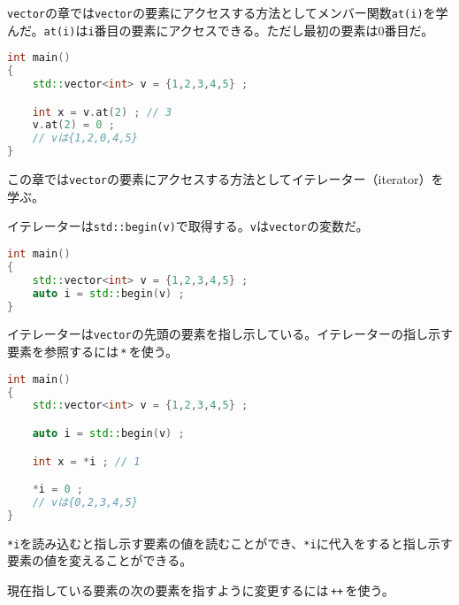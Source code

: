 
\texttt{vector}の章では\texttt{vector}の要素にアクセスする方法としてメンバー関数\texttt{at(i)}を学んだ。\texttt{at(i)}は\texttt{i}番目の要素にアクセスできる。ただし最初の要素は0番目だ。

\begin{lstlisting}[language={C++}]
int main()
{
    std::vector<int> v = {1,2,3,4,5} ;

    int x = v.at(2) ; // 3
    v.at(2) = 0 ;
    // vは{1,2,0,4,5}
}
\end{lstlisting}

この章では\texttt{vector}の要素にアクセスする方法としてイテレーター（iterator）を学ぶ。


イテレーターは\texttt{std::begin(v)}で取得する。\texttt{v}は\texttt{vector}の変数だ。

\begin{lstlisting}[language={C++}]
int main()
{
    std::vector<int> v = {1,2,3,4,5} ;
    auto i = std::begin(v) ;
}
\end{lstlisting}


イテレーターは\texttt{vector}の先頭の要素を指し示している。イテレーターの指し示す要素を参照するには\,\texttt{*}\,を使う。

\begin{lstlisting}[language={C++}]
int main()
{
    std::vector<int> v = {1,2,3,4,5} ;

    auto i = std::begin(v) ;

    int x = *i ; // 1

    *i = 0 ;
    // vは{0,2,3,4,5} 
}
\end{lstlisting}

\texttt{*i}を読み込むと指し示す要素の値を読むことができ、\texttt{*i}に代入をすると指し示す要素の値を変えることができる。


現在指している要素の次の要素を指すように変更するには\,\texttt{++}\,を使う。

